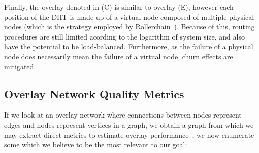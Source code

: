 Finally, the overlay denoted in (C) is similar to overlay (E), however each position of the DHT is made up of a virtual node composed of multiple physical nodes (which is the strategy employed by Rollerchain~\cite{rollerchain}). Because of this, routing procedures are still limited acording to the logarithm of system size, and also have the potential to be load-balanced. Furthermore, as the failure of a physical node does necessarily mean the failure of a virtual node, churn effects are mitigated. 
 
\subsection{Overlay Network Quality Metrics}

If we look at an overlay network where connections between nodes represent edges and nodes represent vertices in a graph, we obtain a graph from which we may extract direct metrics to estimate overlay performance~\cite{leitaoPHDthesis}, we now enumerate some which we believe to be the most relevant to our goal:

